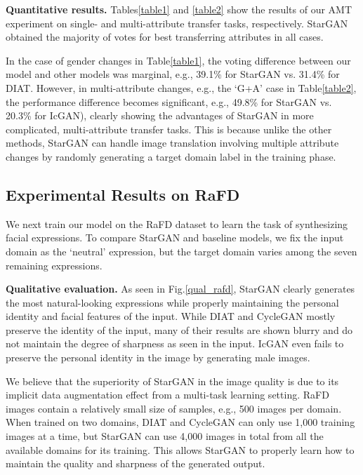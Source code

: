 \textbf{Quantitative results.} Tables\thinspace\ref{table1} and \ref{table2} show the results of our AMT experiment on single- and multi-attribute transfer tasks, respectively. StarGAN obtained the majority of votes for best transferring attributes in all cases. 

In the case of gender changes in Table\thinspace\ref{table1}, the voting difference between our model and other models was marginal, e.g., 39.1\% for StarGAN vs. 31.4\% for DIAT. However, in multi-attribute changes, e.g., the `G+A' case in Table\thinspace\ref{table2}, the performance difference becomes significant, e.g., 49.8\% for StarGAN vs. 20.3\% for IcGAN), clearly showing the advantages of StarGAN in more complicated, multi-attribute transfer tasks. This is because unlike the other methods, StarGAN can handle image translation involving multiple attribute changes by randomly generating a target domain label in the training phase. 

\subsection{Experimental Results on RaFD} We next train our model on the RaFD dataset to learn the task of synthesizing facial expressions. To compare StarGAN and baseline models, we fix the input domain as the `neutral' expression, but the target domain varies among the seven remaining expressions.

\medskip

\textbf{Qualitative evaluation.} As seen in Fig.\thinspace\ref{qual_rafd}, StarGAN clearly generates the most natural-looking expressions while properly maintaining the personal identity and facial features of the input. While DIAT and CycleGAN mostly preserve the identity of the input, many of their results are shown blurry and do not maintain the degree of sharpness as seen in the input. IcGAN even fails to preserve the personal identity in the image by generating male images. 

We believe that the superiority of StarGAN in the image quality is due to its implicit data augmentation effect from a multi-task learning setting. RaFD images contain a relatively small size of samples, e.g., 500 images per domain. When trained on two domains, DIAT and CycleGAN can only use 1,000 training images at a time, but StarGAN can use 4,000 images in total from all the available domains for its training. This allows StarGAN to properly learn how to maintain the quality and sharpness of the generated output.

